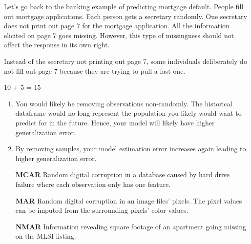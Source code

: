 \documentclass[12pt]{article}
\begin{document}

\begin{enumerate}


Let's go back to the banking example of predicting mortgage default. People fill out mortgage applications. Each person gets a secretary randomly. One secretary does not print out page 7 for the mortgage application. All the information elicited on page 7 goes missing. However, this type of missingness should not affect the response in its own right.


Instead of the secretary not printing out page 7, some individuals deliberately do not fill out page 7 because they are trying to pull a fast one.


10 + 5 = 15


\begin{enumerate}
\item You would likely be removing observations non-randomly. The historical dataframe would no long represent the population you likely would want to predict for in the future. Hence, your model will likely have higher generalization error.
\item By removing samples, your model estimation error increases again leading to higher generalization error.
\end{enumerate}




\begin{enumerate}
\item[\textbf{MCAR}] Random digital corruption in a database caused by hard drive failure where each observation only has one feature.
\item[\textbf{MAR}] Random digital corruption in an image files' pixels. The pixel values can be imputed from the surrounding pixels' color values.
\item[\textbf{NMAR}] Information revealing square footage of an apartment going missing on the MLSI listing.
\end{enumerate}


\end{enumerate}
\end{document}

